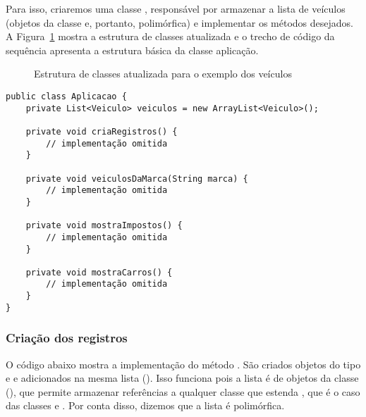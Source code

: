 Para isso, criaremos uma classe , responsável por armazenar a lista de veículos (objetos da classe  e, portanto, polimórfica) e implementar os métodos desejados. A Figura~\ref{fig:exemplo-carro-moto-aplicacao} mostra a estrutura de classes atualizada e o trecho de código da sequência apresenta a estrutura básica da classe aplicação.

\begin{figure}[h]
	\centering
	
	
	\caption{Estrutura de classes atualizada para o exemplo dos veículos}
	\label{fig:exemplo-carro-moto-aplicacao}
\end{figure}

\begin{verbatim}
public class Aplicacao {
	private List<Veiculo> veiculos = new ArrayList<Veiculo>();
	
	private void criaRegistros() {
		// implementação omitida
	}
	
	private void veiculosDaMarca(String marca) {
		// implementação omitida
	}
	
	private void mostraImpostos() {
		// implementação omitida
	}
	
	private void mostraCarros() {
		// implementação omitida
	}
}
\end{verbatim}

\subsubsection{Criação dos registros}

O código abaixo mostra a implementação do método . São criados objetos do tipo  e  e adicionados na mesma lista (). Isso funciona pois a lista é de objetos da classe  (), que permite armazenar referências a qualquer classe que estenda , que é o caso das classes  e . Por conta disso, dizemos que a lista é polimórfica.

